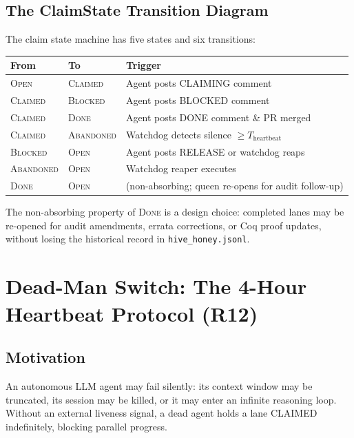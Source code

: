 \subsection{The ClaimState Transition Diagram}
\label{ssec:K-state-machine}

The claim state machine has five states and six transitions:

\begin{center}
\begin{tabular}{lll}
\hline
\textbf{From} & \textbf{To} & \textbf{Trigger} \\
\hline
\textsc{Open} & \textsc{Claimed} &
  Agent posts CLAIMING comment \\
\textsc{Claimed} & \textsc{Blocked} &
  Agent posts BLOCKED comment \\
\textsc{Claimed} & \textsc{Done} &
  Agent posts DONE comment \& PR merged \\
\textsc{Claimed} & \textsc{Abandoned} &
  Watchdog detects silence $\geq T_{\text{heartbeat}}$ \\
\textsc{Blocked} & \textsc{Open} &
  Agent posts RELEASE or watchdog reaps \\
\textsc{Abandoned} & \textsc{Open} &
  Watchdog reaper executes \\
\textsc{Done} & \textsc{Open} &
  (non-absorbing; queen re-opens for audit follow-up) \\
\hline
\end{tabular}
\end{center}

The non-absorbing property of \textsc{Done} is a design choice:
completed lanes may be re-opened for audit amendments, errata
corrections, or Coq proof updates, without losing the historical
record in \texttt{hive\_honey.jsonl}.


\section{Dead-Man Switch: The 4-Hour Heartbeat Protocol (R12)}
\label{sec:K-deadman}

\subsection{Motivation}
\label{ssec:K-deadman-motivation}

An autonomous LLM agent may fail silently: its context window may be
truncated, its session may be killed, or it may enter an infinite
reasoning loop. Without an external liveness signal, a dead agent holds
a lane CLAIMED indefinitely, blocking parallel progress.

